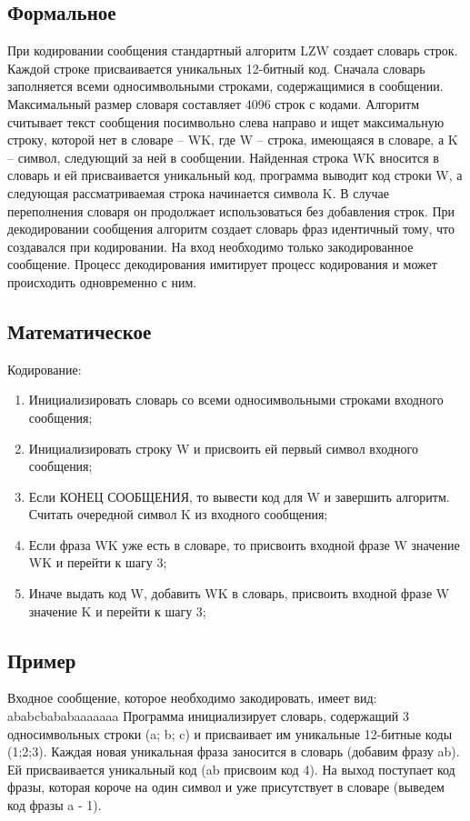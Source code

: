 \documentclass{article}
\begin{document}
\subsection{Формальное}

При кодировании сообщения стандартный алгоритм LZW создает словарь строк. Каждой строке присваивается уникальных 12-битный код. Сначала словарь заполняется всеми односимвольными строками, содержащимися в сообщении. Максимальный размер словаря составляет 4096 строк с кодами. Алгоритм считывает текст сообщения посимвольно слева направо и ищет максимальную строку, которой нет в словаре – WK, где W – строка, имеющаяся в словаре, а K – символ, следующий за ней в сообщении. Найденная строка WK вносится в словарь и ей присваивается уникальный код, программа выводит код строки W, а следующая рассматриваемая строка начинается символа K. В случае переполнения словаря он продолжает использоваться без добавления строк.
При декодировании сообщения алгоритм создает словарь фраз идентичный тому, что создавался при кодировании. На вход необходимо только закодированное сообщение. Процесс декодирования имитирует процесс кодирования и может происходить одновременно с ним.

\subsection{Математическое}

Кодирование:
\begin{enumerate}
\item Инициализировать словарь со всеми односимвольными строками входного сообщения;
\item Инициализировать строку W и присвоить ей первый символ входного сообщения;
\item Если КОНЕЦ СООБЩЕНИЯ, то вывести код для W и завершить алгоритм.
Считать очередной символ K из входного сообщения;
\item Если фраза WK уже есть в словаре, то присвоить входной фразе W значение WK и перейти к шагу 3;
\item Иначе выдать код W, добавить WK в словарь, присвоить входной фразе W значение K и перейти к шагу 3;
\end{enumerate}

\subsection{Пример}

Входное сообщение, которое необходимо закодировать, имеет вид:
ababcbababaaaaaaa
Программа инициализирует словарь, содержащий 3 односимвольных строки (a; b; c) и присваивает им уникальные 12-битные коды (1;2;3). Каждая новая уникальная фраза заносится в словарь (добавим фразу ab). Ей присваивается уникальный код (ab присвоим код 4). На выход поступает код фразы, которая короче на один символ и уже присутствует в словаре (выведем код фразы a - 1).
\end{document}
